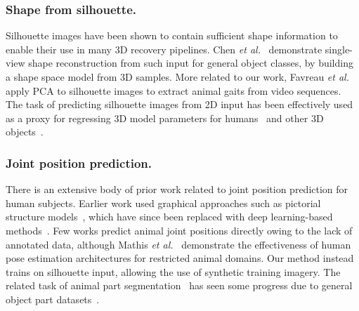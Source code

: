 \subsubsection*{Shape from silhouette.} Silhouette images have been shown to contain sufficient shape information to enable their use in many 3D recovery pipelines. Chen {\em et al.}~\cite{chen2010inferring} demonstrate single-view shape reconstruction from such input for general object classes, by building a shape space model from 3D samples. More related to our work, Favreau {\em et al.}~\cite{favreau2004animal} apply PCA to silhouette images to extract animal gaits from video sequences. The task of predicting silhouette images from 2D input has been effectively used as a proxy for regressing 3D model parameters for humans~\cite{tan17indirect,kanazawa18end-to-end} and other 3D objects~\cite{wiles2017silnet}.

\subsubsection*{Joint position prediction.} There is an extensive body of prior work related to joint position prediction for human subjects. Earlier work used graphical approaches such as pictorial structure models~\cite{andriluka2010monocular,pishchulin2013poselet,johnson2010clustered}, which have since been replaced with deep learning-based methods~\cite{cao2017realtime,bulat2016human}. Few works predict animal joint positions directly owing to the lack of annotated data, although Mathis {\em et al.}~\cite{mathis2018deeplabcut} demonstrate the effectiveness of human pose estimation architectures for restricted animal domains. Our method instead trains on silhouette input, allowing the use of synthetic training imagery. The related task of animal part segmentation~\cite{wang2015joint,wang2015semantic} has seen some progress due to general object part datasets~\cite{chen_cvpr14,zhou2017scene}.

